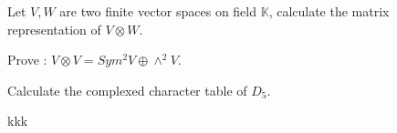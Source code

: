 \documentclass{ctexart}
\newif\ifpreface
\begin{document}
\large
\setlength{\baselineskip}{1.2em}
\ifpreface
    
\else
\maketitle
\fi
{}
\begin{problem}
  Let \(V, W \) are two finite vector spaces on field \(\mathbb{K}\), calculate the matrix
  representation of \(V \otimes W\).
\end{problem}

\begin{problem}
  Prove : \(V \otimes V = Sym^2 V \oplus \wedge^2 V \).
\end{problem}

\begin{problem}
  Calculate the complexed character table of \(D_5\).
\end{problem}
\begin{solution}
  kkk
\end{solution}
\end{document}
